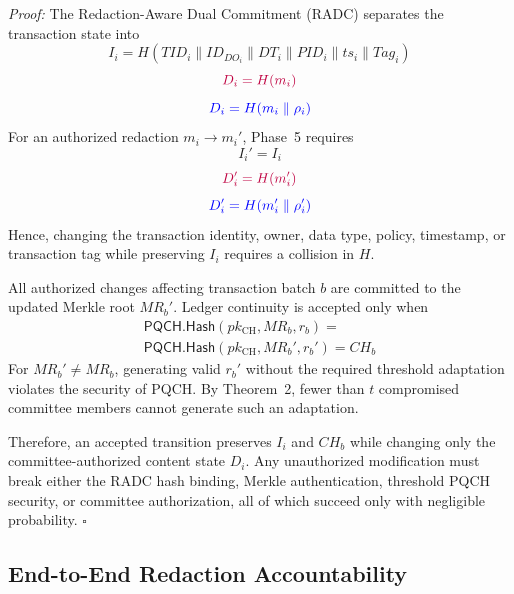 \documentclass[lettersize,journal]{IEEEtran}
\begin{document}
\emph{Proof:}
The Redaction-Aware Dual Commitment (RADC) separates the transaction
state into
\begin{equation}
I_i=
H(TID_i\parallel ID_{DO_i}\parallel DT_i
\parallel PID_i\parallel ts_i\parallel Tag_i)
\end{equation}
\begin{equation}
{\color{purple}D_i=H(m_i)}
\end{equation}
\begin{equation}
{\color{blue}D_i=H(m_i\parallel\rho_i)}
\label{eq:sec_radc_original}
\end{equation}
For an authorized redaction $m_i\rightarrow m_i'$, Phase~5 requires
\begin{equation}
I_i'=I_i
\end{equation}
\begin{equation}
{\color{purple}D_i'=H(m_i')}
\end{equation}
\begin{equation}
{\color{blue}D_i'=H(m_i'\parallel\rho_i')}
\label{eq:sec_radc_transition}
\end{equation}
Hence, changing the transaction identity, owner, data type, policy, timestamp, or transaction tag while preserving $I_i$ requires a collision in $H$.

All authorized changes affecting transaction batch $b$ are committed to the updated Merkle root $MR_b'$. Ledger continuity is accepted only when
\begin{equation}
\begin{split}
\mathsf{PQCH.Hash}(pk_{\mathrm{CH}},MR_b,r_b)
=\\
\mathsf{PQCH.Hash}(pk_{\mathrm{CH}},MR_b',r_b')
=
CH_b
\label{eq:sec_ch_continuity}
\end{split}
\end{equation}
For $MR_b'\neq MR_b$, generating valid $r_b'$ without the required
threshold adaptation violates the security of PQCH. By Theorem~2,
fewer than $t$ compromised committee members cannot generate such an
adaptation.

Therefore, an accepted transition preserves $I_i$ and $CH_b$ while changing only the committee-authorized content state $D_i$. Any unauthorized modification must break either the RADC hash binding, Merkle authentication, threshold PQCH security, or committee authorization, all of which succeed only with negligible probability.
\hfill$\square$


\subsection{End-to-End Redaction Accountability}
\end{document}
